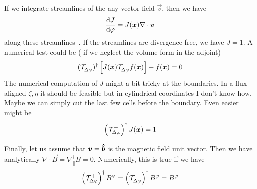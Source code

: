 If we integrate streamlines of the any vector field $\vec v$, then we have
\begin{align}
    \frac{\mathrm{d} J}{\mathrm{d} \varphi} = J({\boldsymbol{x}} ) \nabla\cdot{\boldsymbol{v}}
    \label{}
\end{align}
along these streamlines~\cite{something}.
If the streamlines are divergence free, we have $J=1$.
A numerical test could be ( if we neglect the volume form in the adjoint)
\begin{align}
    (\mathcal T^+_{\Delta\varphi})^\dagger \left[J({\boldsymbol{x}})\mathcal T^+_{\Delta\varphi} f({\boldsymbol{x}})\right] - f({\boldsymbol{x}}) = 0
    \label{}
\end{align}
The numerical computation of $J$ might a bit tricky at the boundaries.
In a flux-aligned $\zeta, \eta$ it should be feasible but in cylindrical coordinates I don't know how. Maybe we can simply cut the last few cells before the boundary.
Even easier might be
\begin{align}
    \left(\mathcal T^+_{\Delta\varphi}\right)^\dagger J({\boldsymbol{x}} ) = 1
    \label{}
\end{align}

Finally, let us assume that ${\boldsymbol{v}} = \bm{\hat{b}}$ is the magnetic field
unit vector. Then we have analytically $\nabla\cdot \vec B= \nabla_\parallel^\dagger B = 0$.
Numerically, this is true if we have
\begin{align}
\left(\mathcal T^+_{\Delta\varphi}\right)^\dagger B^\varphi  = \left(\mathcal T^-_{\Delta\varphi}\right)^\dagger B^\varphi = B^\varphi
\end{align}


